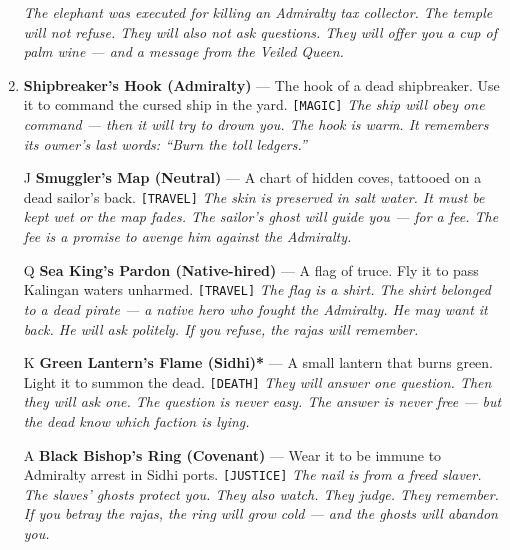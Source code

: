 \begin{enumerate}
  \hfill \textit{The elephant was executed for killing an Admiralty tax collector. The temple will not refuse. They will also not ask questions. They will offer you a cup of palm wine --- and a message from the Veiled Queen.}
\item \textbf{Shipbreaker's Hook (Admiralty)\textdaggerdbl} --- The hook of a dead shipbreaker. Use it to command the cursed ship in the yard. \texttt{[MAGIC]}
  \hfill \textit{The ship will obey one command --- then it will try to drown you. The hook is warm. It remembers its owner's last words: ``Burn the toll ledgers.''}
\item[J] \textbf{Smuggler's Map (Neutral)} --- A chart of hidden coves, tattooed on a dead sailor's back. \texttt{[TRAVEL]}
  \hfill \textit{The skin is preserved in salt water. It must be kept wet or the map fades. The sailor's ghost will guide you --- for a fee. The fee is a promise to avenge him against the Admiralty.}
\item[Q] \textbf{Sea King's Pardon (Native-hired)\textdagger} --- A flag of truce. Fly it to pass Kalingan waters unharmed. \texttt{[TRAVEL]}
  \hfill \textit{The flag is a shirt. The shirt belonged to a dead pirate --- a native hero who fought the Admiralty. He may want it back. He will ask politely. If you refuse, the rajas will remember.}
\item[K] \textbf{Green Lantern's Flame (Sidhi)*} --- A small lantern that burns green. Light it to summon the dead. \texttt{[DEATH]}
  \hfill \textit{They will answer one question. Then they will ask one. The question is never easy. The answer is never free --- but the dead know which faction is lying.}
\item[A] \textbf{Black Bishop's Ring (Covenant)} --- Wear it to be immune to Admiralty arrest in Sidhi ports. \texttt{[JUSTICE]}
  \hfill \textit{The nail is from a freed slaver. The slaves' ghosts protect you. They also watch. They judge. They remember. If you betray the rajas, the ring will grow cold --- and the ghosts will abandon you.}
\end{enumerate}


